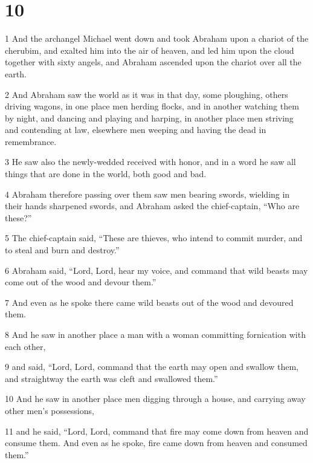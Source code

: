 \chapter{10}

\par 1 And the archangel Michael went down and took Abraham upon a chariot of the cherubim, and exalted him into the air of heaven, and led him upon the cloud together with sixty angels, and Abraham ascended upon the chariot over all the earth. 

\par 2 And Abraham saw the world as it was in that day, some ploughing, others driving wagons, in one place men herding flocks, and in another watching them by night, and dancing and playing and harping, in another place men striving and contending at law, elsewhere men weeping and having the dead in remembrance. 

\par 3 He saw also the newly-wedded received with honor, and in a word he saw all things that are done in the world, both good and bad. 

\par 4 Abraham therefore passing over them saw men bearing swords, wielding in their hands sharpened swords, and Abraham asked the chief-captain, “Who are these?” 

\par 5 The chief-captain said, “These are thieves, who intend to commit murder, and to steal and burn and destroy.” 

\par 6 Abraham said, “Lord, Lord, hear my voice, and command that wild beasts may come out of the wood and devour them.” 

\par 7 And even as he spoke there came wild beasts out of the wood and devoured them. 

\par 8 And he saw in another place a man with a woman committing fornication with each other, 

\par 9 and said, “Lord, Lord, command that the earth may open and swallow them, and straightway the earth was cleft and swallowed them.” 

\par 10 And he saw in another place men digging through a house, and carrying away other men's possessions, 

\par 11 and he said, “Lord, Lord, command that fire may come down from heaven and consume them. And even as he spoke, fire came down from heaven and consumed them.” 

